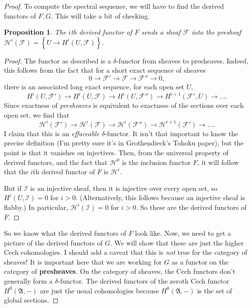 \documentclass{article}
\newtheorem{proposition}{Proposition}
\begin{document}
\begin{proof}
To compute the spectral sequence, we will have to find the derived functors of
$F,G$. This will take a bit of checking.


\begin{proposition} 
The $i$th derived functor of $F$ sends a sheaf $\mathcal{F}$ into the presheaf
$\mathcal{H}^i(\mathcal{F}) = \left\{U \to H^i(U, \mathcal{F})\right\}$.
\end{proposition} 
\begin{proof} 
The functor as described is a $\delta$-functor from sheaves to presheaves.
Indeed, this follows from the fact that for a short exact sequence of sheaves
\[ 0 \to \mathcal{F}' \to \mathcal{F} \to \mathcal{F}'' \to 0,  \]
there is an associated long exact sequence, for each open set $U$, 
\[ H^i(U,\mathcal{F}' ) \to H^i(U, \mathcal{F}) \to H^i(U, \mathcal{F}'') \to
H^{i+1}(\mathcal{F}', U) \to \dots. \]
Since exactness of \emph{presheaves} is equivalent to exactness of the sections
over each open set, we find that
\[ \mathcal{H}^i(\mathcal{F}') \to  \mathcal{H}^i(\mathcal{F}) \to 
\mathcal{H}^i(\mathcal{F}'') \to \mathcal{H}^{i+1}(\mathcal{F}') \to \dots. \]
I claim that this is an \emph{effaceable} $\delta$-functor. It isn't that
important to know the precise definition (I'm pretty sure it's in
Grothendieck's Tohoku paper), but the point is that it vanishes on injectives.
Then, from the universal property of derived functors, and the fact that
$\mathcal{H}^0$ is the inclusion functor $F$, it will follow that the $i$th
derived functor of $F$ is $\mathcal{H}^i$. 

But if $\mathcal{I}$ is an injective sheaf, then it is injective over every
open set, so $H^i(U, \mathcal{I})=0$ for $i >0$. (Alternatively, this follows
because an injective sheaf is flabby.) In particular,
$\mathcal{H}^i(\mathcal{I})=0$ for $i>0$. So these are the derived functors of
$F$.
\end{proof} 

So we know what the derived functors of $F$ look like. Now, we need to get a
picture of the derived functors of $G$. We will show that these are just the
higher Cech cohomologies. I should add a caveat that this is \emph{not} true
for the category of sheaves! It is important here that we are working for $G$
as a functor on the category of \textbf{presheaves}. On the category of
sheaves, the Cech functors don't generally form a $\delta$-functor. The derived
functors of the zeroth Cech functor $H^0(\mathfrak{A}, -)$ are just the usual
cohomologies because $H^0(\mathfrak{A}, -)$ is the set of global sections.


\end{proof}
\end{document}
